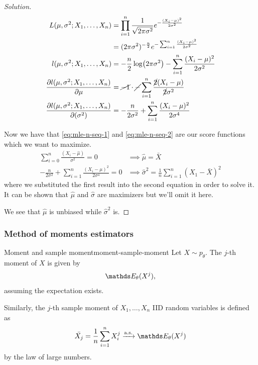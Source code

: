 \documentclass[12pt]{extarticle}
\newcommand{\convas}{\xrightarrow{\operatorfont a.s.}}
\begin{document}
\begin{proof}[Solution]
	\begin{align}
		L(\mu,\sigma^2; X_1, \dots, X_n)                   & = \prod_{i = 1}^n \frac{1}{\sqrt{2 \pi \sigma^2}} e^{-\frac{(X_i - \mu)^2}{2 \sigma^2}}                                 \\
		                                                   & = (2 \pi \sigma^2)^{-\frac{n}{2}} e^{- \sum_{i = 1}^n \frac{(X_i - \mu)^2}{2 \sigma^2}}                                 \\
		l(\mu,\sigma^2; X_1, \dots, X_n)                   & = -\frac{n}{2}\log(2 \pi \sigma^2) - \sum_{i = 1}^n \frac{(X_i - \mu)^2}{2 \sigma^2}                                    \\
		\pdv{l(\mu,\sigma^2; X_1, \dots, X_n)}{\mu}        & = \cancel{-1 }\cdot \cancel{-} \sum_{i = 1}^n \frac{\cancel{2}(X_i - \mu)}{\cancel{2} \sigma^2}  \label{eq:mle-n-seq-1} \\
		\pdv{l(\mu,\sigma^2; X_1, \dots, X_n)}{(\sigma^2)} & = -\frac{n}{2 \sigma^2} + \sum_{i = 1}^n \frac{(X_i - \mu)^2}{2 \sigma^4} \label{eq:mle-n-seq-2}
	\end{align}

	Now we have that \cref{eq:mle-n-seq-1} and \cref{eq:mle-n-seq-2} are our score functions which we want to maximize.
	\begin{align}
		\sum_{i = 0}^{n} \frac{(X_i - \hat \mu)}{\sigma^2} = 0                      & \implies \hat \mu = \bar X                                            \\
		-\frac{n}{2 \sigma^2} + \sum_{i = 1}^n \frac{(X_i - \mu)^2}{2 \sigma^4} = 0 & \implies \hat{\sigma}^2 = \frac{1}{n} \sum_{i = 1}^n (X_1 - \bar X)^2
	\end{align}
	where we substituted the first result into the second equation in order to solve it.
	It can be shown that $\hat \mu$ and $\hat \sigma$ are maximizers but we'll omit it here.

	We see that $\hat \mu$ is unbiased while $\hat \sigma ^2$ is.
\end{proof}

\subsubsection{Method of moments estimators}

\begin{definition}{Moment and sample moment}{moment-sample-moment}
	Let $X \sim p_\theta$. The $j$-th moment of $X$ is given by
	\begin{equation}
		\E_\theta(X^j),
	\end{equation}
	assuming the expectation exists.

	Similarly, the $j$-th sample moment of $X_1,\dots, X_n$ IID random variables is defined as
	\begin{equation}
		\bar{X_j} = \frac{1}{n} \sum_{i = 1}^n X_i^j \convas \E_\theta(X^j)
	\end{equation}
	by the law of large numbers.
\end{definition}
\end{document}
